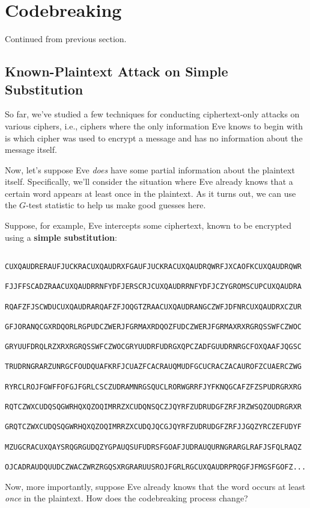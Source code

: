 \documentclass[letterpaper]{article}
\begin{document}
\section{Codebreaking}
Continued from previous section.

\subsection{Known-Plaintext Attack on Simple Substitution}
So far, we've studied a few techniques for conducting ciphertext-only attacks on various ciphers, i.e., ciphers where the only information Eve knows to begin with is which cipher was used to encrypt a message and has no information about the message itself. 

\bigskip 

Now, let's suppose Eve \emph{does} have some partial information about the plaintext itself. Specifically, we'll consider the situation where Eve already knows that a certain word appears at least once in the plaintext. As it turns out, we can use the $G$-test statistic to help us make good guesses here. 

\bigskip 

Suppose, for example, Eve intercepts some ciphertext, known to be encrypted using a \textbf{simple substitution}:
\begin{verbatim}
    CUXQAUDRERAUFJUCKRACUXQAUDRXFGAUFJUCKRACUXQAUDRQWRFJXCAOFKCUXQAUDRQWR
    FJJFFSCADZRAACUXQAUDRRNFYDFJERSCRJCUXQAUDRRNFYDFJCZYGROMSCUPCUXQAUDRA
    RQAFZFJSCWDUCUXQAUDRARQAFZFJOQGTZRAACUXQAUDRANGCZWFJDFNRCUXQAUDRXCZUR
    GFJORANQCGXRDQORLRGPUDCZWERJFGRMAXRDQOZFUDCZWERJFGRMAXRXRGRQSSWFCZWOC
    GRYUUFDRQLRZXRXRGRQSSWFCZWOCGRYUUDRFUDRGXQPCZADFGUUDRNRGCFOXQAAFJQGSC
    TRUDRNGRARZUNRGCFOUDQUAFKRFJCUAZFCACRAUQMUDFGCUCRACZACAUROFZCUAERCZWG
    RYRCLROJFGWFFOFGJFGRLCSCZUDRAMNRGSQUCLRORWGRRFJYFKNQGCAFZFZSPUDRGRXRG
    RQTCZWXCUDQSQGWRHQXQZOQIMRRZXCUDQNSQCZJQYRFZUDRUDGFZRFJRZWSQZOUDRGRXR
    GRQTCZWXCUDQSQGWRHQXQZOQIMRRZXCUDQJQCGJQYRFZUDRUDGFZRFJJGQZYRCZEFUDYF
    MZUGCRACUXQAYSRQGRGUDQZYGPAUQSUFUDRSFGOAFJUDRAUQURNGRARGLRAFJSFQLRAQZ
    OJCADRAUDQUUDCZWACZWRZRGQSXRGRARUUSROJFGRLRGCUXQAUDRPRQGFJFMGSFGOFZ...\end{verbatim}
Now, more importantly, suppose Eve already knows that the word  occurs at least \emph{once} in the plaintext. How does the codebreaking process change? 
\end{document}
